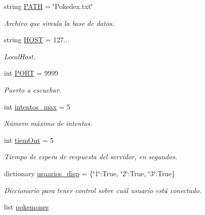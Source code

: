 \begin{DoxyCompactItemize}
\item 
string \hyperlink{namespaceservidor_a841929f3d10a7b72399f0925da460cd9}{P\+A\+TH} = \char`\"{}Pokedex.\+txt\char`\"{}
\begin{DoxyCompactList}\small\item\em Archivo que simula la base de datos. \end{DoxyCompactList}\item 
string \hyperlink{namespaceservidor_ab5793eb47d5467cdb26a6193b7196ecf}{H\+O\+ST} = \textquotesingle{}127...\textquotesingle{}
\begin{DoxyCompactList}\small\item\em Local\+Host. \end{DoxyCompactList}\item 
int \hyperlink{namespaceservidor_abc87a53cb2df8d9c399e979b4dbd45fa}{P\+O\+RT} = 9999
\begin{DoxyCompactList}\small\item\em Puerto a escuchar. \end{DoxyCompactList}\item 
int \hyperlink{namespaceservidor_a32acd4b3f7d9a4ca9489be7adaa1e209}{intentos\+\_\+max} = 5
\begin{DoxyCompactList}\small\item\em Número máximo de intentos. \end{DoxyCompactList}\item 
\mbox{\label{namespaceservidor_ace44552d92d27a9778ad8215559c3c74}} 
int \hyperlink{namespaceservidor_ace44552d92d27a9778ad8215559c3c74}{tiem\+Out} = 5
\begin{DoxyCompactList}\small\item\em Tiempo de espera de respuesta del servidor, en segundos. \end{DoxyCompactList}\item 
dictionary \hyperlink{namespaceservidor_a426dd886ca17c5f85d5638637ffdf558}{usuarios\+\_\+disp} = \{\char`\"{}1\char`\"{}\+:True, \char`\"{}2\char`\"{}\+:True, \char`\"{}3\char`\"{}\+:True\}
\begin{DoxyCompactList}\small\item\em Diccionario para tener control sobre cuál usuario está conectado. \end{DoxyCompactList}\item 
list \hyperlink{namespaceservidor_ad51227f75b32d668586bfc7516a1d140}{pokemones}

\end{DoxyCompactItemize}

